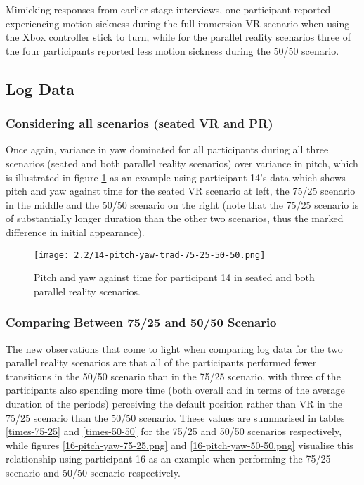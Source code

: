 Mimicking responses from earlier stage interviews, one participant reported experiencing motion sickness during the full immersion VR scenario when using the Xbox controller stick to turn, while for the parallel reality scenarios three of the four participants reported less motion sickness during the 50/50 scenario.


\subsection{Log Data}

\subsubsection{Considering all scenarios (seated VR and PR)}

Once again, variance in yaw dominated for all participants during all three scenarios (seated and both parallel reality scenarios) over variance in pitch, which is illustrated in figure \ref{14-pitch-yaw-trad-75-25-50-50.png} as an example using participant 14's data which shows pitch and yaw against time for the seated VR scenario at left, the 75/25 scenario in the middle and the 50/50 scenario on the right (note that the 75/25 scenario is of substantially longer duration than the other two scenarios, thus the marked difference in initial appearance).

\begin{figure}[h]
	\begin{center}
	\texttt{[image: 2.2/14-pitch-yaw-trad-75-25-50-50.png]}
	\caption{Pitch and yaw against time for participant 14 in seated and both parallel reality scenarios.}
	\label{14-pitch-yaw-trad-75-25-50-50.png}
	\end{center}
\end{figure}


\subsubsection{Comparing Between 75/25 and 50/50 Scenario}

The new observations that come to light when comparing log data for the two parallel reality scenarios are that all of the participants performed fewer transitions in the 50/50 scenario than in the 75/25 scenario, with three of the participants also spending more time (both overall and in terms of the average duration of the periods) perceiving the default position rather than VR in the 75/25 scenario than the 50/50 scenario. These values are summarised in tables \ref{times-75-25} and \ref{times-50-50} for the 75/25 and 50/50 scenarios respectively, while figures \ref{16-pitch-yaw-75-25.png} and \ref{16-pitch-yaw-50-50.png} visualise this relationship using participant 16 as an example when performing the 75/25 scenario and 50/50 scenario respectively.

